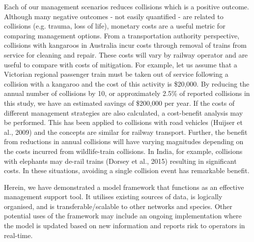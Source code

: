 Each of our management scenarios reduces collisions which is a positive outcome.  Although many negative outcomes - not easily quantified - are related to collisions (e.g. trauma, loss of life), monetary costs are a useful metric for comparing management options. From a transportation authority perspective, collisions with kangaroos in Australia incur costs through removal of trains from service for cleaning and repair.  These costs will vary by railway operator and are useful to compare with costs of mitigation.  For example, let us assume that a Victorian regional passenger train must be taken out of service following a collision with a kangaroo and the cost of this activity is \$20,000.  By reducing the annual number of collisions by 10, or approximately 2.5\% of reported collisions in this study, we have an estimated savings of \$200,000 per year.  If the costs of different management strategies are also calculated, a cost-benefit analysis may be performed.  This has been applied to collisions with road vehicles (Huijser et al., 2009) and the concepts are similar for railway transport. Further, the benefit from reductions in annual collisions will have varying magnitudes depending on the costs incurred from wildlife-train collisions. In India, for example, collisions with elephants may de-rail trains (Dorsey et al., 2015) resulting in significant costs. In these situations, avoiding a single collision event has remarkable benefit.

Herein, we have demonstrated a model framework that functions as an effective management support tool. It utilises existing sources of data, is logically organised, and is transferable/scalable to other networks and species. Other potential uses of the framework may include an ongoing implementation where the model is updated based on new information and reports risk to operators in real-time.